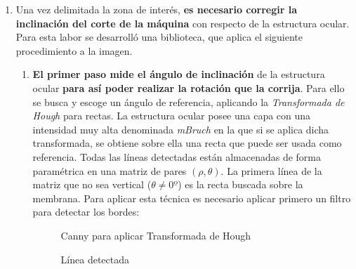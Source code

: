 \begin{enumerate}
\begin{enumerate}[label*=\arabic*.]
\begin{enumerate}[label*=\arabic*.]
    \end{enumerate}
  \end{enumerate}
\item Una vez delimitada la zona de interés, \textbf{es necesario
    corregir la inclinación del corte de la máquina} con respecto de
  la estructura ocular. \\
  Para esta labor se desarrolló una biblioteca, que aplica el
  siguiente procedimiento a la imagen.
  \begin{enumerate}[label*=\arabic*.]
  \item \textbf{El primer paso mide el ángulo de inclinación} de la
    estructura ocular \textbf{para así poder realizar la rotación que
      la corrija}.  Para ello se busca y escoge un ángulo de
    referencia, aplicando la \emph{Transformada de
      Hough} para rectas. La estructura
    ocular posee una capa con una intensidad muy alta denominada
    \emph{\gls{mBruch}} en la que si se aplica dicha transformada, se
    obtiene sobre ella una recta que puede ser usada como
    referencia. Todas las líneas detectadas están almacenadas de forma
    paramétrica en una matriz de pares $\left(\rho, \theta \right)$.
    La primera línea de la matriz que no sea vertical
    ($\theta \neq 0º$) es la recta buscada sobre la membrana. Para
    aplicar esta técnica es necesario aplicar primero un filtro para
    detectar los bordes:

    \begin{figure}[H]
      \caption{Canny para aplicar Transformada de Hough}
      \centering \setlength\fboxsep{0pt} \setlength\fboxrule{0.5pt}
    \end{figure}

    \begin{figure}[H]
      \caption{Línea detectada}
      \centering \setlength\fboxsep{0pt} \setlength\fboxrule{0.5pt}
    \end{figure}



\end{enumerate}
\end{enumerate}
